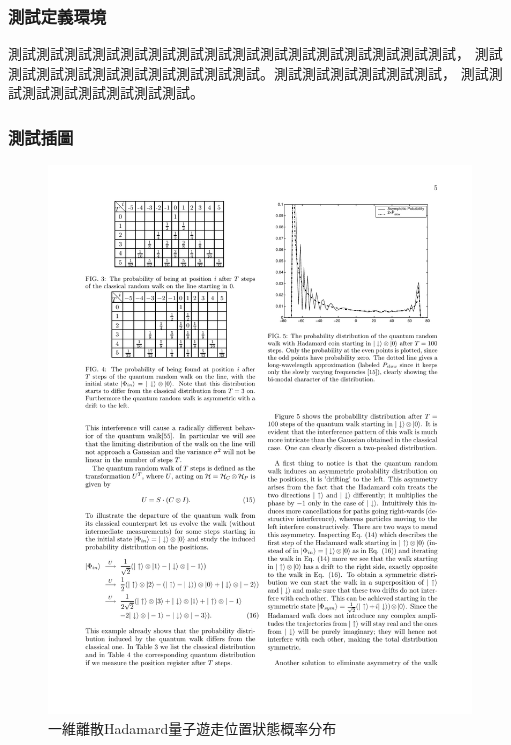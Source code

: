 \documentclass[10pt,serif,t]{beamer}
\begin{document}
\begin{frame}
  \frametitle{測試定義環境}
  \begin{definition}
    測試測試測試測試測試測試測試測試測試測試測試測試測試測試測試測試，
    測試測試測試測試測試測試測試測試測試測試。測試測試測試測試測試測試，
    測試測試測試測試測試測試測試測試。
  \end{definition}
\end{frame}

\begin{frame}
  \frametitle{測試插圖}  
  \begin{figure}
    \centering
    \includegraphics[height=0.6\textheight]{1d_hadamard_quantum_walk.pdf}
    \caption{一維離散Hadamard量子遊走位置狀態概率分布}
  \end{figure}
\end{frame}
\end{document}

